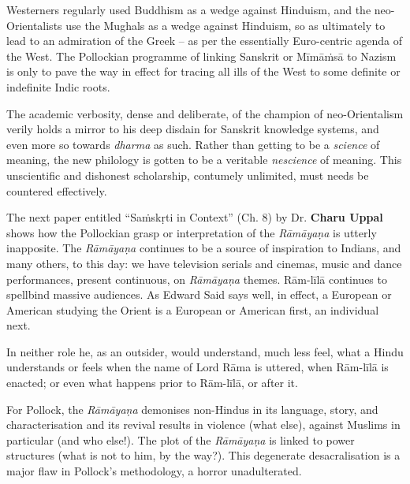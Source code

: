 Westerners regularly used Buddhism as a wedge against Hinduism, and the neo-Orientalists use the Mughals as a wedge against Hinduism, so as ultimately to lead to an admiration of the Greek – as per the essentially Euro-centric agenda of the West. The Pollockian programme of linking Sanskrit or Mīmāṁsā to Nazism is only to pave the way in effect for tracing all ills of the West to some definite or indefinite Indic roots.

\vskip 2pt

The academic verbosity, dense and deliberate, of the champion of neo-Orientalism verily holds a mirror to his deep disdain for Sanskrit knowledge systems, and even more so towards \textit{dharma} as such. Rather than getting to be a \textit{science} of meaning, the new philology is gotten to be a veritable \textit{nescience} of meaning. This unscientific and dishonest scholarship, contumely unlimited, must needs be countered effectively.

\vskip 2pt

The next paper entitled “Saṁskṛti in Context” (Ch. 8) by Dr. \textbf{Charu Uppal} shows how the Pollockian grasp or interpretation of the \textit{Rāmāyaṇa} is utterly inapposite. The \textit{Rāmāyaṇa} continues to be a source of inspiration to Indians, and many others, to this day: we have television serials and cinemas, music and dance performances, present continuous, on \textit{Rāmāyaṇa} themes. Rām-līlā continues to spellbind massive audiences. As Edward Said says well, in effect, a European or American studying the Orient is a European or American first, an individual next.

In neither role he, as an outsider, would understand, much less feel, what a Hindu understands or feels when the name of Lord Rāma is uttered, when Rām-līlā is enacted; or even what happens prior to Rām-līlā, or after it.

For Pollock, the \textit{Rāmāyaṇa} demonises non-Hindus in its language, story, and characterisation and its revival results in violence (what else), against Muslims in particular (and who else!). The plot of the \textit{Rāmāyaṇa} is linked to power structures (what is not to him, by the way?). This degenerate desacralisation is a major flaw in Pollock’s methodology, a horror unadulterated.

